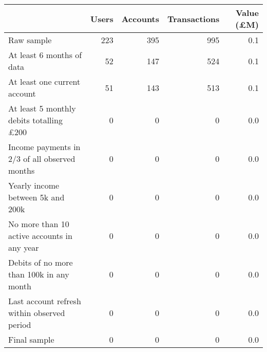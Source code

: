 \begin{tabular}{lrrrr}
\toprule
                                               & Users & Accounts & Transactions & Value (\pounds M) \\
\midrule
                                    Raw sample &   223 &      395 &          995 &               0.1 \\
                     At least 6 months of data &    52 &      147 &          524 &               0.1 \\
                  At least one current account &    51 &      143 &          513 &               0.1 \\
At least 5 monthly debits totalling \pounds200 &     0 &        0 &            0 &               0.0 \\
 Income payments in 2/3 of all observed months &     0 &        0 &            0 &               0.0 \\
             Yearly income between 5k and 200k &     0 &        0 &            0 &               0.0 \\
   No more than 10 active accounts in any year &     0 &        0 &            0 &               0.0 \\
      Debits of no more than 100k in any month &     0 &        0 &            0 &               0.0 \\
   Last account refresh within observed period &     0 &        0 &            0 &               0.0 \\
                                  Final sample &     0 &        0 &            0 &               0.0 \\
\bottomrule
\end{tabular}

